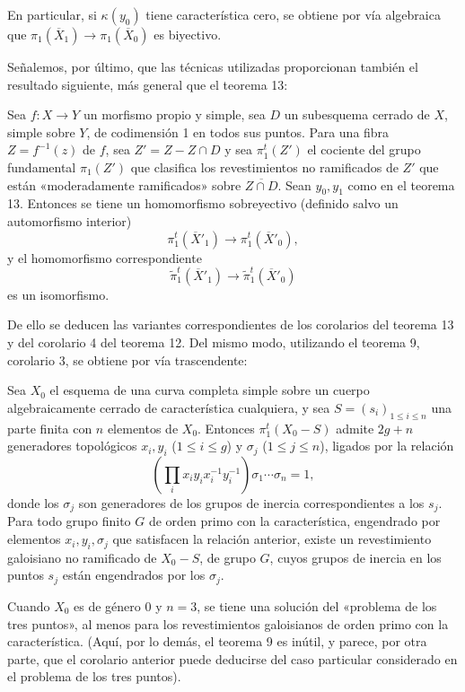 En particular, si $\kappa(y_0)$ tiene característica cero, se obtiene por vía
algebraica que $\pi_1(\overline X_1)\longrightarrow\pi_1(\overline X_0)$ es
biyectivo.

Señalemos, por último, que las técnicas utilizadas proporcionan también el
resultado siguiente, más general que el teorema 13:

 Sea $f:X\longrightarrow Y$ un morfismo propio y simple,
sea $D$ un subesquema cerrado de $X$, simple sobre $Y$, de codimensión 1 en
todos sus puntos. Para una fibra $Z=f^{-1}(z)$ de $f$, sea $Z'=Z-Z\cap D$ y sea
$\pi_1^t(Z')$ el cociente del grupo fundamental $\pi_1(Z')$ que clasifica los
revestimientos no ramificados de $Z'$ que están «moderadamente ramificados»
sobre $\overline{Z\cap D}$. Sean $y_0,y_1$ como en el teorema 13. Entonces se
tiene un homomorfismo sobreyectivo (definido salvo un automorfismo interior)
\[
  \pi_1^t(\overline X'_1)\longrightarrow\pi_1^t(\overline X'_0),
\]
y el homomorfismo correspondiente
\[
  \widetilde\pi_1^t(\overline X'_1)
  \longrightarrow\widetilde\pi_1^t(\overline X'_0)
\]
es un isomorfismo.

De ello se deducen las variantes correspondientes de los corolarios del
teorema 13 y del corolario 4 del teorema 12. Del mismo modo, utilizando el
teorema 9, corolario 3, se obtiene por vía trascendente:

 Sea $X_0$ el esquema de una curva completa simple sobre un
cuerpo algebraicamente cerrado de característica cualquiera, y sea
$S=(s_i)_{1\le i\le n}$ una parte finita con $n$ elementos de $X_0$. Entonces
$\pi_1^t(X_0-S)$ admite $2g+n$ generadores topológicos
$x_i,y_i$ ($1\le i\le g$) y $\sigma_j$ ($1\le j\le n$), ligados por la relación
\[
  \left(\prod_i x_i y_i x_i^{-1}y_i^{-1}\right)
  \sigma_1\cdots\sigma_n=1,
\]
donde los $\sigma_j$ son generadores de los grupos de inercia correspondientes
a los $s_j$. Para todo grupo finito $G$ de orden primo con la característica,
engendrado por elementos $x_i,y_i,\sigma_j$ que satisfacen la relación anterior,
existe un revestimiento galoisiano no ramificado de $X_0-S$, de grupo $G$, cuyos
grupos de inercia en los puntos $s_j$ están engendrados por los $\sigma_j$.

Cuando $X_0$ es de género 0 y $n=3$, se tiene una solución del «problema de los
tres puntos», al menos para los revestimientos galoisianos de orden primo con
la característica. (Aquí, por lo demás, el teorema 9 es inútil, y parece, por
otra parte, que el corolario anterior puede deducirse del caso particular
considerado en el problema de los tres puntos).

